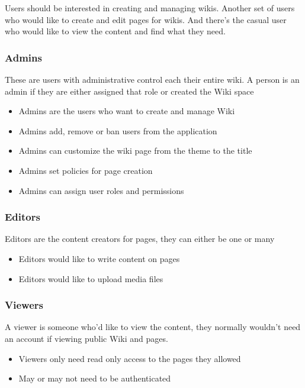 \documentclass{article}
\begin{document}
Users should be interested in creating and managing wikis. Another set of users who would like to create and edit pages for wikis. And there's the casual user who would like to view the content and find what they need.

\subsubsection{Admins}
These are users with administrative control each their entire wiki. A person is an admin if they are either assigned that role or created the Wiki space

\begin{itemize}
    \item Admins are the users who want to create and manage Wiki
    \item Admins add, remove or ban users from the application
    \item Admins can customize the wiki page from the theme to the title
    \item Admins set policies for page creation
    \item Admins can assign user roles and permissions
\end{itemize}

\subsubsection{Editors}
Editors are the content creators for pages, they can either be one or many

\begin{itemize}
    \item Editors would like to write content on pages
    \item Editors would like to upload media files 
\end{itemize}

\subsubsection{Viewers}
A viewer is someone who'd like to view the content, they normally wouldn't need an account if viewing public Wiki and pages.

\begin{itemize}
    \item Viewers only need read only access to the pages they allowed
    \item May or may not need to be authenticated
\end{itemize}
\end{document}
